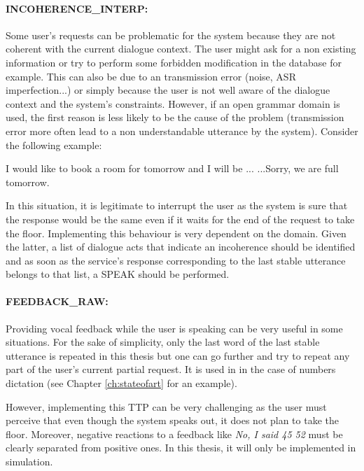      \paragraph{INCOHERENCE\_INTERP:} Some user's requests can be problematic for the system because they are not coherent with the current dialogue context. The user might ask for a non existing information or try to perform some forbidden modification in the database for example. This can also be due to an transmission error (noise, ASR imperfection...) or simply because the user is not well aware of the dialogue context and the system's constraints. However, if an open grammar domain is used, the first reason is less likely to be the cause of the problem (transmission error more often lead to a non understandable utterance by the system). Consider the following example:
		
					\begin{dialogue}
						 I would like to book a room for tomorrow and I will be ...
						 ...Sorry, we are full tomorrow.
					\end{dialogue}
					
					In this situation, it is legitimate to interrupt the user as the system is sure that the response would be the same even if it waits for the end of the request to take the floor. Implementing this behaviour is very dependent on the domain. Given the latter, a list of dialogue acts that indicate an incoherence should be identified and as soon as the service's response corresponding to the last stable utterance belongs to that list, a SPEAK should be performed.
					
			\paragraph{FEEDBACK\_RAW:} Providing vocal feedback while the user is speaking can be very useful in some situations. For the sake of simplicity, only the last word of the last stable utterance is repeated in this thesis but one can go further and try to repeat any part of the user's current partial request. It is used in \cite{Skantze2009,Khouzaimi2014a} in the case of numbers dictation (see Chapter \ref{ch:stateofart} for an example).
			
				However, implementing this TTP can be very challenging as the user must perceive that even though the system speaks out, it does not plan to take the floor. Moreover, negative reactions to a feedback like \textit{No, I said 45 52} must be clearly separated from positive ones. In this thesis, it will only be implemented in simulation.
				
